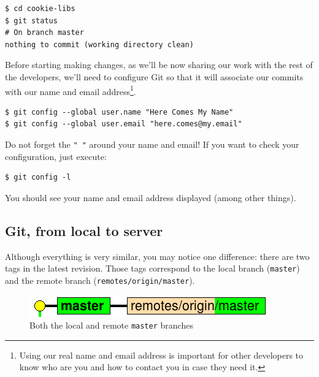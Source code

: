 \documentclass[a4paper,10pt]{article}
\newenvironment{terminal}
  {
    \vspace{+10pt}
    \begin{center}
    \begin{minipage}{0.95\textwidth}
    \begin{framed}
  }
  {
    \end{framed}
    \end{minipage}
    \end{center}
    \vspace{+10pt}
  }
\begin{document}
\begin{terminal}
\begin{verbatim}
$ cd cookie-libs
$ git status
# On branch master
nothing to commit (working directory clean)
\end{verbatim}%
\end{terminal}

Before starting making changes, as we'll be now sharing our work with
the rest of the developers, we'll need to configure Git so that it will
associate our commits with our name and email address\footnote{Using
our real name and email address is important for other developers to
know who are you and how to contact you in case they need it.}.

\begin{terminal}
\begin{verbatim}
$ git config --global user.name "Here Comes My Name"
$ git config --global user.email "here.comes@my.email"
\end{verbatim}%
\end{terminal}

Do not forget the \texttt{" "} around your name and email! If you want
to check your configuration, just execute:

\begin{terminal}
\begin{verbatim}
$ git config -l
\end{verbatim}%
\end{terminal}

You should see your name and email address displayed (among other
things).

\subsection{Git, from local to server}

Although everything is very similar, you may notice one difference:
there are two tags in the latest
revision. Those tags correspond to the local branch (\texttt{master})
and the remote
branch (\texttt{remotes/origin/master}).

\begin{figure}[h]
  \begin{center}
    \includegraphics[scale=0.5]{server-00}
  \end{center}
  \caption{Both the local and remote \texttt{master} branches}
\end{figure}
\end{document}
